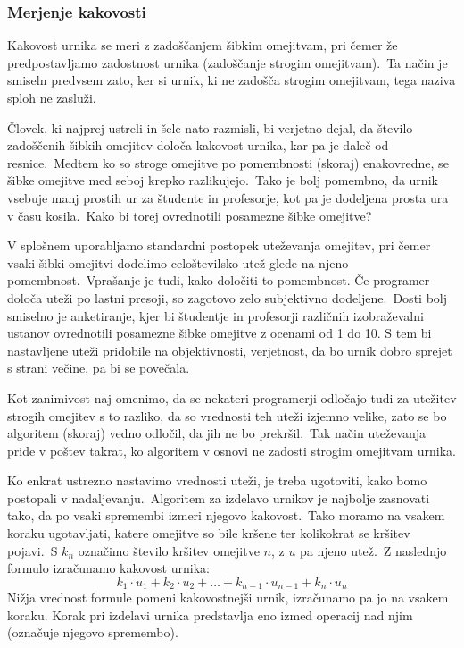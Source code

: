 \documentclass[a4paper,10pt]{article}
\begin{document}
\subsubsection{Merjenje kakovosti}

Kakovost urnika se meri z zadoščanjem šibkim omejitvam, pri čemer že predpostavljamo
zadostnost urnika (zadoščanje strogim omejitvam).\ Ta način je smiseln predvsem zato,
ker si urnik, ki ne zadošča strogim omejitvam, tega naziva sploh ne zasluži.

Človek, ki najprej ustreli in šele nato razmisli, bi verjetno dejal, da število
zadoščenih šibkih omejitev določa kakovost urnika, kar pa je daleč od resnice.\ Medtem
ko so stroge omejitve po pomembnosti (skoraj) enakovredne, se šibke omejitve med seboj
krepko razlikujejo.\ Tako je bolj pomembno, da urnik vsebuje manj prostih ur za
študente in profesorje, kot pa je dodeljena prosta ura v času kosila.\ Kako bi torej
ovrednotili posamezne šibke omejitve?

V splošnem uporabljamo standardni postopek uteževanja omejitev, pri čemer vsaki šibki
omejitvi dodelimo celoštevilsko utež glede na njeno pomembnost.\ Vprašanje je tudi, kako
določiti to pomembnost. Če programer določa uteži po lastni presoji, so zagotovo zelo
subjektivno dodeljene.\ Dosti bolj smiselno je anketiranje, kjer bi študentje in profesorji
različnih izobraževalni ustanov ovrednotili posamezne šibke omejitve z ocenami od 1 do 10.
S tem bi nastavljene uteži pridobile na objektivnosti, verjetnost, da bo urnik dobro
sprejet s strani večine, pa bi se povečala.

Kot zanimivost naj omenimo, da se nekateri programerji odločajo tudi za utežitev strogih
omejitev s to razliko, da so vrednosti teh uteži izjemno velike, zato se bo algoritem
(skoraj) vedno \frqq{}odločil\flqq{}, da jih ne bo prekršil.\ Tak način uteževanja pride v poštev
takrat, ko algoritem v osnovi ne zadosti strogim omejitvam urnika.

Ko enkrat ustrezno nastavimo vrednosti uteži, je treba ugotoviti, kako bomo postopali
v nadaljevanju.\ Algoritem za izdelavo urnikov je najbolje zasnovati tako, da po vsaki
spremembi izmeri njegovo kakovost.\ Tako moramo na vsakem koraku ugotavljati, katere
omejitve so bile kršene ter kolikokrat se kršitev pojavi.\ S \(k_n\) označimo število
kršitev omejitve \(n\), z \(u\) pa njeno utež.\ Z naslednjo formulo izračunamo
kakovost urnika:
\[ k_1 \cdot u_1 + k_2 \cdot u_2 + \ldots + k_ {n-1} \cdot u_{n-1} +  k_n \cdot u_n \]
Nižja vrednost formule pomeni kakovostnejši urnik, izračunamo pa jo na vsakem koraku.
Korak pri izdelavi urnika predstavlja eno izmed operacij nad njim (označuje njegovo
spremembo).
\end{document}
